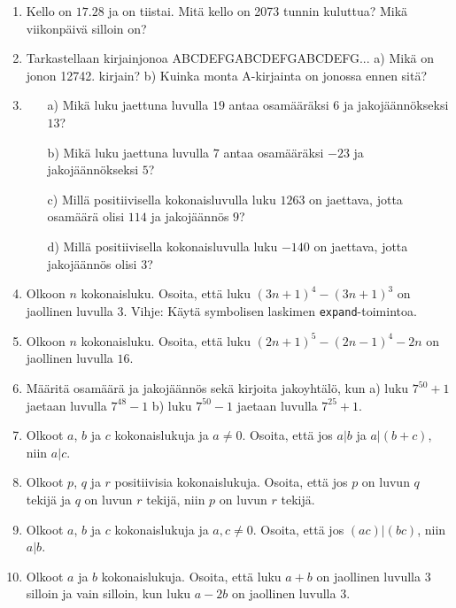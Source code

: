 \begin{enumerate}
\item Kello on $17.28$ ja on tiistai. Mitä kello on 2073 tunnin kuluttua? Mikä viikonpäivä silloin on?

\item Tarkastellaan kirjainjonoa ABCDEFGABCDEFGABCDEFG... a) Mikä on jonon 12742. kirjain? b) Kuinka monta A-kirjainta on jonossa ennen sitä?

\item 
\begin{itemize}
\item[a)] Mikä luku jaettuna luvulla $19$ antaa osamääräksi $6$ ja jakojäännökseksi $13$?
\item[b)] Mikä luku jaettuna luvulla $7$ antaa osamääräksi $-23$ ja jakojäännökseksi $5$?
\item[c)] Millä positiivisella kokonaisluvulla luku $1263$ on jaettava, jotta osamäärä olisi $114$ ja jakojäännös $9$?
\item[d)]  Millä positiivisella kokonaisluvulla luku $-140$ on jaettava, jotta jakojäännös olisi $3$?
\end{itemize}

\item Olkoon $n$ kokonaisluku. Osoita, että luku $(3n+1)^4 - (3n+1)^3$ on jaollinen luvulla 3. Vihje: Käytä symbolisen laskimen {\tt expand}-toimintoa.

\item Olkoon $n$ kokonaisluku. Osoita, että luku $(2n+1)^5 - (2n-1)^4-2n$ on jaollinen luvulla $16$.

\item Määritä osamäärä ja jakojäännös sekä kirjoita jakoyhtälö, kun a) luku $7^{50} + 1$ jaetaan luvulla $7^{48} - 1$ b) luku $7^{50} - 1$ jaetaan luvulla $7^{25} + 1$.

\item Olkoot $a$, $b$ ja $c$ kokonaislukuja ja $a \neq 0$. Osoita, että jos $a|b$ ja $a|(b + c)$, niin $a|c$.

\item Olkoot $p$, $q$ ja $r$ positiivisia kokonaislukuja. Osoita, että jos $p$ on luvun $q$ tekijä ja $q$ on luvun $r$ tekijä, niin $p$ on luvun $r$ tekijä.

\item Olkoot $a$, $b$ ja $c$ kokonaislukuja ja $a,c \neq 0$. Osoita, että jos $(ac)|(bc)$, niin $a|b$.

\item Olkoot $a$ ja $b$ kokonaislukuja. Osoita, että luku $a + b$ on jaollinen luvulla $3$ silloin ja vain silloin, kun luku $a - 2b$ on jaollinen luvulla $3$.


\end{enumerate}
